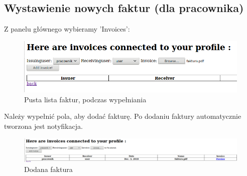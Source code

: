 \documentclass[12pt]{article}
\begin{document}
\subsection{Wystawienie nowych faktur (dla pracownika)}
Z panelu głównego wybieramy 'Invoices':
\begin{figure}[H]
	\centering
	\includegraphics[scale=0.5]{img/7.png}
	\caption{Pusta lista faktur, podczas wypełniania}
\end{figure}
Należy wypełnić pola, aby dodać fakturę. Po dodaniu faktury automatycznie tworzona jest notyfikacja.
\begin{figure}[H]
	\centering
	\includegraphics[scale=0.3]{img/8.png}
	\caption{Dodana faktura}
\end{figure}
\end{document}

